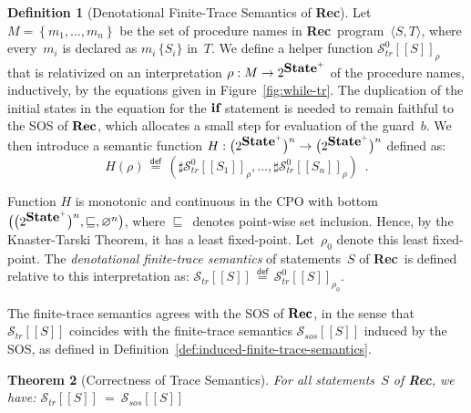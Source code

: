 \documentclass[10pt,a4paper]{amsart}
\newtheorem{theorem}{Theorem}[section]
\theoremstyle{definition}
\newtheorem{definition}[theorem]{Definition}
\newcommand{\defeq}{\stackrel{\mathsf{def}}{=}}
\newcommand{\set}[1]{\left\{ #1 \right\}}
\newcommand{\denot}[1]{\left[\!\left[#1\right]\!\right]}
\newcommand{\trcdenot}[1]{\mathcal{S}_{\mathit{tr}}\!\denot{#1}}
\newcommand{\trcdenoth}[1]{\mathcal{S}^0_{\mathit{tr}}\!\denot{#1}}
\newcommand{\sosdenot}[1]{\mathcal{S}_{\mathit{sos}}\!\denot{#1}}
\newcommand{\Rec}{\mbox{\bf Rec}}
\newcommand{\If}{\mbox{\bf if}}
\newcommand{\State}{\mbox{\bf State}}
\begin{document}
\begin{definition}[Denotational Finite-Trace Semantics of \Rec]
\label{def:while-tr}
Let~$M = \set{m_1,\ldots,m_n}$ be the set of procedure names in \Rec\
program~$\langle S,T\rangle$, where every~$m_i$ is declared as
$m_i\,\{S_i\}$ in~$T$.
%
We define a helper function $\trcdenoth{S}_\rho$ that is relativized
on an interpretation $\rho : M \rightarrow 2^{\State^+}$ of the
procedure names, inductively, by the equations given in
Figure~\ref{fig:while-tr}.
%
The duplication of the initial states in the equation for the $\If$
statement is needed to remain faithful to the SOS of $\Rec$, which
allocates a small step for evaluation of the guard~$b$.
%
We then introduce a semantic function
$ H : \bigl(2^{\State^+}\bigr)^n \rightarrow \bigl(2^{\State^+}\bigr)^n $ 
defined as:
$$
H (\rho) \,\defeq\, (\sharp \trcdenoth{S_1}_\rho, \ldots, \sharp \trcdenoth{S_n}_\rho)\enspace .
$$

Function $H$ is monotonic and continuous in the CPO with bottom
$\bigl(\bigl(2^{\State^+}\bigr)^n, \sqsubseteq, \varnothing^n\bigr)$,
where $\sqsubseteq$~denotes point-wise set inclusion.  Hence, by the
Knaster-Tarski Theorem, it has a least fixed-point.
%
Let~$\rho_0$ denote this least fixed-point.
%
The \emph{denotational finite-trace semantics} of statements~$S$
of \Rec\ is defined relative to this inter\-pretation as:
%
$ \trcdenot{S} \,\defeq\, \trcdenoth{S}_{\rho_0} $.
\end{definition}



The finite-trace semantics agrees with the SOS of $\Rec$, in the sense
that $\trcdenot{S}$ coincides with the finite-trace semantics
$\sosdenot{S}$ induced by the SOS, as defined in
Definition~\ref{def:induced-finite-trace-semantics}.

\begin{theorem}[Correctness of Trace Semantics]
\label{thm:semantics-correctness-rec}
For all statements~$S$ of \Rec, we have:
$ \trcdenot{S} \>=\> \sosdenot{S} $
\end{theorem}


\end{document}
